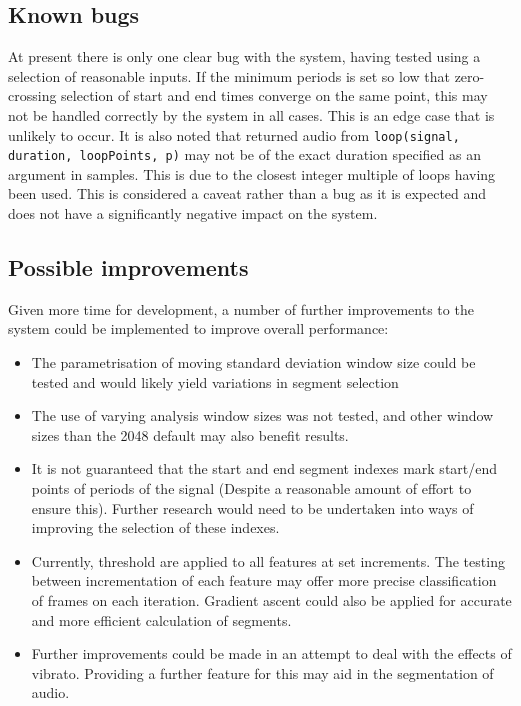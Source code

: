 \documentclass[titlepage]{scrartcl}
\begin{document}
\subsection{Known bugs}
At present there is only one clear bug with the system, having tested using a
selection of reasonable inputs. If the minimum periods is set so low that
zero-crossing selection of start and end times converge on the same point, this
may not be handled correctly by the system in all cases. This is an edge case
that is unlikely to occur.
It is also noted that returned audio from \texttt{loop(signal, duration,
loopPoints, p)} may not be of the exact duration specified as an argument in
samples. This is due to the closest integer multiple of loops having been used.
This is considered a caveat rather than a bug as it is expected and does not
have a significantly negative impact on the system.

\subsection{Possible improvements}
Given more time for development, a number of further improvements to the system
could be implemented to improve overall performance:
\begin{itemize}
    \item The parametrisation of moving standard deviation window size could
        be tested and would likely yield variations in segment selection
    \item The use of varying analysis window sizes was not tested, and other
        window sizes than the 2048 default may also benefit results.
    \item It is not guaranteed that the start and end segment indexes mark
        start/end points of periods of the signal (Despite a reasonable amount
        of effort to ensure this). Further research would need to be undertaken
        into ways of improving the selection of these indexes.
    \item Currently, threshold are applied to all features at set increments.
        The testing between incrementation of each feature may offer more
        precise classification of frames on each iteration. Gradient ascent
        could also be applied for accurate and more efficient calculation of
        segments.
    \item Further improvements could be made in an attempt to deal with the
        effects of vibrato. Providing a further feature for this may aid in the
        segmentation of audio.
\end{itemize}
\end{document}
